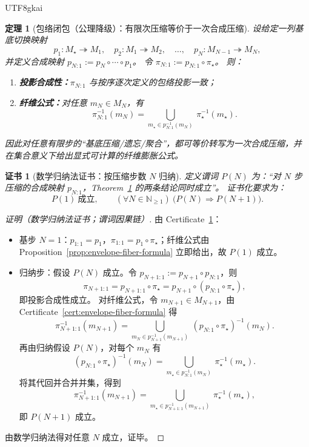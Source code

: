 \documentclass[12pt]{article}
\newtheorem{theorem}{定理}[section]
\newtheorem{certificate}{证书}[section]
\begin{document}
\begin{CJK*}{UTF8}{gkai}
\begin{theorem}[包络闭包（公理降级）：有限次压缩等价于一次合成压缩]
\label{thm:envelope-closure}
设给定一列基底切换映射
\[
p_1:M_\star\twoheadrightarrow M_1,\quad
p_2:M_1\twoheadrightarrow M_2,\quad \ldots,\quad
p_N:M_{N-1}\twoheadrightarrow M_N,
\]
并定义合成映射 $p_{N:1}:=p_N\circ\cdots\circ p_1$。
令 $\pi_{N:1}:=p_{N:1}\circ\pi_\star$。
则：
\begin{enumerate}
  \item \textbf{投影合成性：}$\pi_{N:1}$ 与按序逐次定义的包络投影一致；
  \item \textbf{纤维公式：}对任意 $m_N\in M_N$，有
  \[
  \pi_{N:1}^{-1}(m_N)
  =
  \bigcup_{m_\star\in p_{N:1}^{-1}(m_N)}\ \pi_\star^{-1}(m_\star).
  \]
\end{enumerate}
因此对任意有限步的“基底压缩/遗忘/聚合”，都可等价转写为一次合成压缩，并在集合意义下给出显式可计算的纤维膨胀公式。
\end{theorem}

\begin{certificate}[数学归纳法证书：按压缩步数 $N$ 归纳]
\label{cert:envelope-closure-induction}
定义谓词 $P(N)$ 为：“对 $N$ 步压缩的合成映射 $p_{N:1}$，Theorem~\ref{thm:envelope-closure} 的两条结论同时成立”。
证书化要求为：
\[
P(1)\ \text{成立},\qquad
(\forall N\in\mathbb{N}_{\ge 1})\ \bigl(P(N)\Rightarrow P(N+1)\bigr).
\]
\end{certificate}

\begin{proof}[证明（数学归纳法证书；谓词因果链）]
由 Certificate~\ref{cert:envelope-closure-induction}：
\begin{itemize}
  \item 基步 $N=1$：$p_{1:1}=p_1$，$\pi_{1:1}=p_1\circ\pi_\star$；纤维公式由 Proposition~\ref{prop:envelope-fiber-formula} 立即给出，故
    $P(1)$ 成立。
  \item 归纳步：假设 $P(N)$ 成立。令 $p_{N+1:1}:=p_{N+1}\circ p_{N:1}$，则
  \[
  \pi_{N+1:1}
  =
  p_{N+1:1}\circ\pi_\star
  =
  p_{N+1}\circ(p_{N:1}\circ\pi_\star),
  \]
  即投影合成性成立。
  对纤维公式，令 $m_{N+1}\in M_{N+1}$，由 Certificate~\ref{cert:envelope-fiber-formula} 得
  \[
  \pi_{N+1:1}^{-1}(m_{N+1})
  =
  \bigcup_{m_N\in p_{N+1}^{-1}(m_{N+1})}\ (p_{N:1}\circ\pi_\star)^{-1}(m_N).
  \]
  再由归纳假设 $P(N)$，对每个 $m_N$ 有
  \[
  (p_{N:1}\circ\pi_\star)^{-1}(m_N)
  =
  \bigcup_{m_\star\in p_{N:1}^{-1}(m_N)}\ \pi_\star^{-1}(m_\star).
  \]
  将其代回并合并并集，得到
  \[
  \pi_{N+1:1}^{-1}(m_{N+1})
  =
  \bigcup_{m_\star\in p_{N+1:1}^{-1}(m_{N+1})}\ \pi_\star^{-1}(m_\star),
  \]
  即 $P(N+1)$ 成立。
\end{itemize}
由数学归纳法得对任意 $N$ 成立，证毕。
\end{proof}


\end{CJK*}
\end{document}
